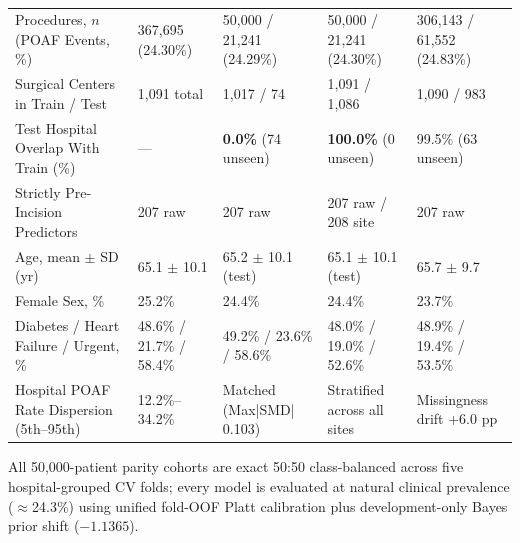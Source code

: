 \begin{table}[t]
\centering
\caption{}
\label{tab:cohort}
\tablefont
\setlength{\tabcolsep}{4.2pt}
\begin{tabularx}{\textwidth}{@{}Y R{2.05cm} R{2.35cm} R{2.35cm} R{2.35cm}@{}}
\toprule
{} &  &  &  &  \\
\midrule
Procedures, $n$ (POAF Events, \%) & 367,695 (24.30\%) & 50,000 / 21,241 (24.29\%) & 50,000 / 21,241 (24.30\%) & 306,143 / 61,552 (24.83\%) \\
Surgical Centers in Train / Test & 1,091 total & 1,017 / 74 & 1,091 / 1,086 & 1,090 / 983 \\
Test Hospital Overlap With Train (\%) & --- & \textbf{0.0\%} (74 unseen) & \textbf{100.0\%} (0 unseen) & 99.5\% (63 unseen) \\
Strictly Pre-Incision Predictors & 207 raw & 207 raw & 207 raw / 208 site & 207 raw \\
Age, mean $\pm$ SD (yr) & 65.1 $\pm$ 10.1 & 65.2 $\pm$ 10.1 (test) & 65.1 $\pm$ 10.1 (test) & 65.7 $\pm$ 9.7 \\
Female Sex, \% & 25.2\% & 24.4\% & 24.4\% & 23.7\% \\
Diabetes / Heart Failure / Urgent, \% & 48.6\% / 21.7\% / 58.4\% & 49.2\% / 23.6\% / 58.6\% & 48.0\% / 19.0\% / 52.6\% & 48.9\% / 19.4\% / 53.5\% \\
Hospital POAF Rate Dispersion (5th--95th) & 12.2\%--34.2\% & Matched (Max|SMD| 0.103) & Stratified across all sites & Missingness drift +6.0 pp \\
\bottomrule
\end{tabularx}
\vspace{2pt}
{\raggedright\sffamily\fontsize{6.9}{8.6}\selectfont\color{sub}All 50,000-patient parity cohorts are exact 50:50 class-balanced across five hospital-grouped CV folds; every model is evaluated at natural clinical prevalence ($\approx$24.3\%) using unified fold-OOF Platt calibration plus development-only Bayes prior shift ($-1.1365$).\par}
\end{table}
